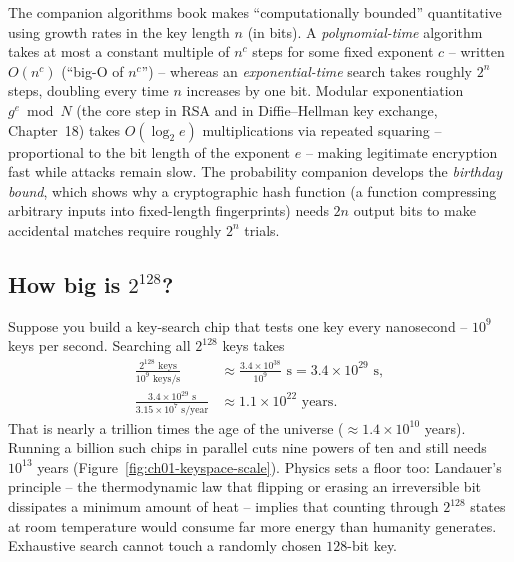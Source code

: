 \begin{connectionbox}
The companion algorithms book makes ``computationally bounded'' quantitative using growth rates in the key length $n$ (in bits). A \emph{polynomial-time} algorithm takes at most a constant multiple of $n^c$ steps for some fixed exponent $c$ -- written $O(n^c)$ (``big-O of $n^c$'') -- whereas an \emph{exponential-time} search takes roughly $2^n$ steps, doubling every time $n$ increases by one bit. Modular exponentiation $g^e \bmod N$ (the core step in RSA and in Diffie--Hellman key exchange, Chapter~18) takes $O(\log_2 e)$ multiplications via repeated squaring -- proportional to the bit length of the exponent $e$ -- making legitimate encryption fast while attacks remain slow. The probability companion develops the \emph{birthday bound}, which shows why a cryptographic hash function (a function compressing arbitrary inputs into fixed-length fingerprints) needs $2n$ output bits to make accidental matches require roughly $2^n$ trials.
\end{connectionbox}

\subsection*{How big is $2^{128}$?}

Suppose you build a key-search chip that tests one key every nanosecond -- $10^9$ keys per second. Searching all $2^{128}$ keys takes
\begin{align*}
\frac{2^{128}\text{ keys}}{10^{9}\text{ keys/s}}
  &\approx \frac{3.4 \times 10^{38}}{10^{9}}\text{ s} = 3.4 \times 10^{29}\text{ s}, \\[3pt]
\frac{3.4 \times 10^{29}\text{ s}}{3.15 \times 10^{7}\text{ s/year}}
  &\approx 1.1 \times 10^{22}\text{ years}.
\end{align*}
That is nearly a trillion times the age of the universe ($\approx 1.4 \times 10^{10}$ years). Running a billion such chips in parallel cuts nine powers of ten and still needs $10^{13}$ years (Figure~\ref{fig:ch01-keyspace-scale}). Physics sets a floor too: Landauer's principle -- the thermodynamic law that flipping or erasing an irreversible bit dissipates a minimum amount of heat -- implies that counting through $2^{128}$ states at room temperature would consume far more energy than humanity generates. Exhaustive search cannot touch a randomly chosen $128$-bit key.

